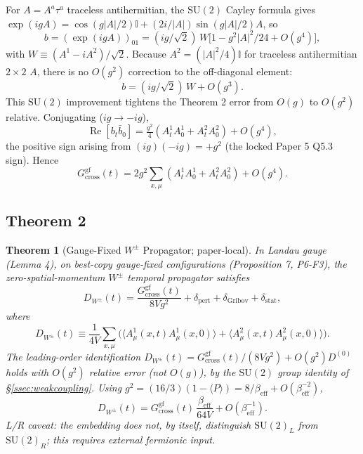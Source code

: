 \documentclass[11pt,a4paper]{article}
\theoremstyle{plain}
\newtheorem{theorem}{Theorem}
\theoremstyle{definition}
\theoremstyle{remark}
\newcommand{\SU}{\mathrm{SU}}
\renewcommand{\Re}{\operatorname{Re}}
\newcommand{\Gcrossgf}{G_{\mathrm{cross}}^{\mathrm{gf}}}
\newcommand{\DW}{D_{W^{\pm}}}
\newcommand{\be}{\beta_{\mathrm{eff}}}
\newcommand{\Id}{\mathbb{I}}
\begin{document}
For $A=A^a\tau^a$ traceless antihermitian, the $\SU(2)$ Cayley formula
gives $\exp(igA)=\cos(g|A|/2)\Id+(2i/|A|)\sin(g|A|/2)A$, so
\begin{equation}
  b=(\exp(igA))_{01}=(ig/\sqrt2)\,W
  \bigl[1-g^2|A|^2/24+O(g^4)\bigr],
  \label{eq:bexpand}
\end{equation}
with $W\equiv(A^1-iA^2)/\sqrt2$. Because $A^2=(|A|^2/4)\Id$ for
traceless antihermitian $2\times2$ $A$, there is no $O(g^2)$ correction
to the off-diagonal element:
\begin{equation}
  b=(ig/\sqrt2)\,W+O(g^3).
  \label{eq:bclean}
\end{equation}
This $\SU(2)$ improvement tightens the Theorem 2 error from $O(g)$ to
$O(g^2)$ relative. Conjugating ($ig\to-ig$),
\begin{equation}
  \Re[b_t\bar b_0]=\tfrac{g^2}{4}(A^1_tA^1_0+A^2_tA^2_0)+O(g^4),
  \label{eq:Rebb}
\end{equation}
the positive sign arising from $(ig)(-ig)=+g^2$ (the locked Paper 5
Q5.3 sign). Hence
\begin{equation}
  \Gcrossgf(t)=2g^2\sum_{x,\mu}(A^1_tA^1_0+A^2_tA^2_0)+O(g^4).
  \label{eq:gcrossOg2}
\end{equation}

\subsection{Theorem 2}
\label{ssec:theorem2statement}

\setcounter{theorem}{1}
\begin{theorem}[Gauge-Fixed $W^{\pm}$ Propagator; paper-local]
In Landau gauge (Lemma 4), on best-copy gauge-fixed configurations
(Proposition 7, P6-F3), the zero-spatial-momentum $W^{\pm}$ temporal
propagator satisfies
\begin{equation}
  \DW(t)=\frac{\Gcrossgf(t)}{8Vg^2}
  +\delta_{\mathrm{pert}}+\delta_{\mathrm{Gribov}}+\delta_{\mathrm{stat}},
  \label{eq:thm2}
\end{equation}
where
\begin{equation}
  \DW(t)\equiv\frac{1}{4V}\sum_{x,\mu}
  \bigl(\langle A^1_\mu(x,t)A^1_\mu(x,0)\rangle
  +\langle A^2_\mu(x,t)A^2_\mu(x,0)\rangle\bigr).
  \label{eq:DWdef}
\end{equation}
The leading-order identification $\DW(t)=\Gcrossgf(t)/(8Vg^2)+O(g^2)D^{(0)}$
holds with $O(g^2)$ relative error (not $O(g)$), by the $\SU(2)$ group
identity of \S\ref{ssec:weakcoupling}. Using $g^2=(16/3)(1-\langle
P\rangle)=8/\be+O(\be^{-2})$,
\begin{equation}
  \DW(t)=\Gcrossgf(t)\,\frac{\be}{64V}+O(\be^{-1}).
  \label{eq:working}
\end{equation}
L/R caveat: the embedding does not, by itself, distinguish $\SU(2)_L$
from $\SU(2)_R$; this requires external fermionic input.
\end{theorem}
\end{document}
